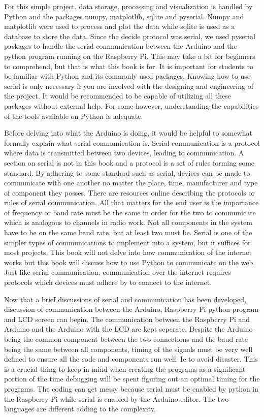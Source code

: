 \documentclass[11pt,a4paper]{book}
\begin{document}
		For this simple project, data storage, processing and visualization is handled by Python and the packages numpy, matplotlib, sqlite and pyserial. Numpy and matplotlib were used to process and plot the data while sqlite is used as a database to store the data. Since the decide protocol was serial, we used pyserial packages to handle the serial communication between the Arduino and the python program  running on the Raspberry Pi. This may take a bit for beginners to comprehend, but that is what this book is for. It is important for students to be familiar with Python and its commonly used packages. Knowing how to use serial is only necessary if you are involved with the designing and engineering of the project. It would be recommended to be capable of utilizing all these packages without external help. For some however, understanding the capabilities of the tools available on Python is adequate.
		
		Before delving into what the Arduino is doing, it would be helpful to somewhat formally explain what serial communication is. Serial communication is a protocol where data is transmitted between two devices, leading to communication. A section on serial is not in this book and a protocol is a set of rules forming some standard. By adhering to some standard such as serial, devices can be made to communicate with one another no matter the place, time, manufacturer and type of component they posses. There are resources online describing the protocols or rules of serial communication. All that matters for the end user is the importance of frequency or baud rate must be the same in order for the two to communicate which is analogous to channels in radio work. Not all components in the system have to be on the same baud rate, but at least two must be. Serial is one of the simpler types of communications to implement into a system, but it suffices for most projects. This book will not delve into how communication of the internet works but this book will discuss how to use Python to communicate on the web. Just like serial communication, communication over the internet requires protocols which devices must adhere by to connect to the internet. 
		
		Now that a brief discussions of serial and communication has been developed, discussion of communication between the Arduino, Raspberry Pi python program and LCD screen can begin. The communication between the Raspberry Pi and Arduino and the Arduino with the LCD are kept seperate. Despite the Arduino being the common component between the two connections and the baud rate being the same between all components, timing of the signals must be very well defined to ensure all the code and components run well. Ie to avoid disaster. This is a crucial thing to keep in mind when creating the programs as a significant portion of the time debugging will be spent figuring out an optimal timing for the programs. The coding can get messy because serial must be enabled by python in the Raspberry Pi while serial is enabled by the Arduino editor. The two languages are different adding to the complexity. 
		
\end{document}
